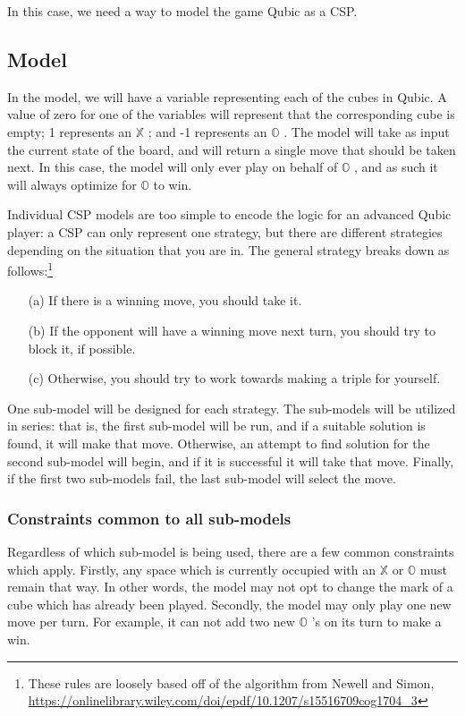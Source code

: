 \documentclass[11pt]{article}
\newcommand{\XX}{$\mathbb{X}$ }
\newcommand{\OO}{$\mathbb{O}$ }
\begin{document}
In this case, we need a way to model the game Qubic as a CSP.

\subsection{Model}
In the model, we will have a variable representing each of the cubes in Qubic. A value of zero for one of the variables will represent that the corresponding cube is empty; 1 represents an \XX; and -1 represents an \OO. The model will take as input the current state of the board, and will return a single move that should be taken next. In this case, the model will only ever play on behalf of \OO, and as such it will always optimize for \OO to win.

Individual CSP models are too simple to encode the logic for an advanced Qubic player: a CSP can only represent one strategy, but there are different strategies depending on the situation that you are in. The general strategy breaks down as follows:\footnote{These rules are loosely based off of the algorithm from Newell and Simon, \url{https://onlinelibrary.wiley.com/doi/epdf/10.1207/s15516709cog1704_3}}
\begin{enumerate}
    \item[(a)] If there is a winning move, you should take it.
    \item[(b)] If the opponent will have a winning move next turn, you should try to block it, if possible.
    \item[(c)] Otherwise, you should try to work towards making a triple for yourself.
\end{enumerate}
One sub-model will be designed for each strategy. The sub-models will be utilized in series: that is, the first sub-model will be run, and if a suitable solution is found, it will make that move. Otherwise, an attempt to find solution for the second sub-model will begin, and if it is successful it will take that move. Finally, if the first two sub-models fail, the last sub-model will select the move.

\subsubsection{Constraints common to all sub-models}
Regardless of which sub-model is being used, there are a few common constraints which apply. Firstly, any space which is currently occupied with an \XX or \OO must remain that way. In other words, the model may not opt to change the mark of a cube which has already been played. Secondly, the model may only play one new move per turn. For example, it can not add two new \OO's on its turn to make a win.
\end{document}
